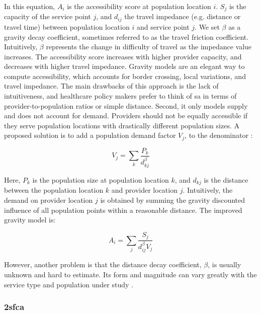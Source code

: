 In this equation, $A_i$ is the accessibility score at population location $i$.
$S_j$ is the capacity of the service point $j$, and $d_{ij}$ the travel
impedance (e.g. distance or travel time) between population location $i$ and
service point $j$. We set $\beta$ as a gravity decay coefficient, sometimes
referred to as the travel friction coefficient. Intuitively, $\beta$ represents
the change in difficulty of travel as the impedance value increases. The
accessibility score increases with higher provider capacity, and decreases with
higher travel impedance. Gravity models are an elegant way to compute
accessibility, which accounts for border crossing, local variations, and travel
impedance. The main drawbacks of this approach is the lack of intuitiveness, and
healthcare policy makers prefer to think of \ac{sa} in terms of
provider-to-population ratios or simple distance. Second, it only models supply
and does not account for demand. Providers should not be equally accessible if
they serve population locations with drastically different population sizes. A
proposed solution is to add a population demand factor $V_j$, to the denominator
\cite{joseph_measuring_1982}:

\begin{equation}
    V_j = \sum_k \frac{P_k}{d_{kj}^{\beta}}
\end{equation}

Here, $P_k$ is the population size at population location $k$, and $d_{kj}$ is
the distance between the population location $k$ and provider location $j$.
Intuitively, the demand on provider location $j$ is obtained by summing the
gravity discounted influence of all population points within a reasonable
distance. The improved gravity model is:

\begin{equation}
    A_i = \sum_j \frac{S_j}{d_{ij}^{\beta} V_j}
\end{equation}

However, another problem is that the distance decay coefficient, $\beta$, is
usually unknown and hard to estimate. Its form and magnitude can vary greatly
with the service type and population under study \cite{talen_assessing_1998}.

\subsubsection{\acf{2sfca}}

